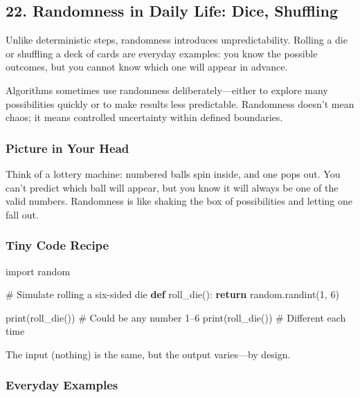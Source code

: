 \documentclass[
  letterpaper,
  DIV=11,
  numbers=noendperiod]{scrreprt}
\newenvironment{Shaded}{\begin{snugshade}}{\end{snugshade}}
\newcommand{\BuiltInTok}[1]{\textcolor[rgb]{0.00,0.23,0.31}{#1}}
\newcommand{\CommentTok}[1]{\textcolor[rgb]{0.37,0.37,0.37}{#1}}
\newcommand{\ControlFlowTok}[1]{\textcolor[rgb]{0.00,0.23,0.31}{\textbf{#1}}}
\newcommand{\DecValTok}[1]{\textcolor[rgb]{0.68,0.00,0.00}{#1}}
\newcommand{\ImportTok}[1]{\textcolor[rgb]{0.00,0.46,0.62}{#1}}
\newcommand{\KeywordTok}[1]{\textcolor[rgb]{0.00,0.23,0.31}{\textbf{#1}}}
\newcommand{\NormalTok}[1]{\textcolor[rgb]{0.00,0.23,0.31}{#1}}
\begin{document}
\subsection{22. Randomness in Daily Life: Dice,
Shuffling}\label{randomness-in-daily-life-dice-shuffling}

Unlike deterministic steps, randomness introduces unpredictability.
Rolling a die or shuffling a deck of cards are everyday examples: you
know the possible outcomes, but you cannot know which one will appear in
advance.

Algorithms sometimes use randomness deliberately---either to explore
many possibilities quickly or to make results less predictable.
Randomness doesn't mean chaos; it means controlled uncertainty within
defined boundaries.

\subsubsection{Picture in Your Head}\label{picture-in-your-head-21}

Think of a lottery machine: numbered balls spin inside, and one pops
out. You can't predict which ball will appear, but you know it will
always be one of the valid numbers. Randomness is like shaking the box
of possibilities and letting one fall out.

\subsubsection{Tiny Code Recipe}\label{tiny-code-recipe-19}

\begin{Shaded}
\begin{Highlighting}[]
\ImportTok{import}\NormalTok{ random}

\CommentTok{\# Simulate rolling a six{-}sided die}
\KeywordTok{def}\NormalTok{ roll\_die():}
    \ControlFlowTok{return}\NormalTok{ random.randint(}\DecValTok{1}\NormalTok{, }\DecValTok{6}\NormalTok{)}

\BuiltInTok{print}\NormalTok{(roll\_die())  }\CommentTok{\# Could be any number 1–6}
\BuiltInTok{print}\NormalTok{(roll\_die())  }\CommentTok{\# Different each time}
\end{Highlighting}
\end{Shaded}

The input (nothing) is the same, but the output varies---by design.

\subsubsection{Everyday Examples}\label{everyday-examples-20}
\end{document}

